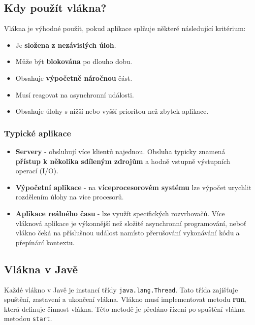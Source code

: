 \subsection{Kdy použít vlákna?}
Vlákna je výhodné použít, pokud aplikace splňuje některé následující kritérium:
\begin{itemize}
	\item Je \textbf{složena}\textbf{ z nezávislých úloh}.
	\item Může být \textbf{blokována} po dlouho dobu.
	\item Obsahuje \textbf{výpočetně náročnou} část.
	\item Musí reagovat na asynchronní události.
	\item Obsahuje úlohy s nižší nebo vyšší prioritou než zbytek aplikace.
\end{itemize}

\subsubsection{Typické aplikace}
\begin{itemize}
	\item \textbf{Servery} - obsluhují více klientů najednou. Obsluha typicky znamená \textbf{přístup k několika sdíleným zdrojům} a hodně vstupně výstupních operací (I/O).
	\item \textbf{Výpočetní aplikace} - na \textbf{víceprocesorovém systému} lze výpočet urychlit rozdělením úlohy na více procesorů.
	\item \textbf{Aplikace reálného času} - lze využít specifických rozvrhovačů. Více vláknová aplikace je výkonnější než složité asynchronní programování, neboť vlákno čeká na příslušnou událost namísto přerušování vykonávání kódu a přepínání kontextu.
\end{itemize}

\subsection{Vlákna v Javě}
Každé vlákno v Javě je instancí třídy \texttt{java.lang.Thread}. Tato třída zajišťuje spuštění, zastavení a ukončení vlákna. Vlákno musí implementovat metodu \textbf{run}, která definuje činnost vlákna. Této metodě je předáno řízení po spuštění vlákna metodou \texttt{start}.

